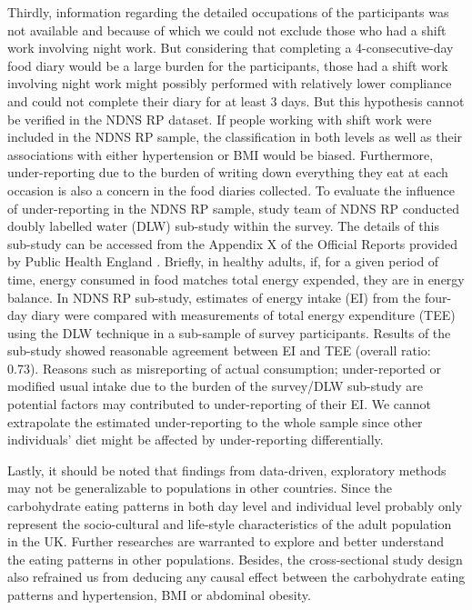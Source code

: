 Thirdly, information regarding the detailed occupations of the participants was not available and because of which we could not exclude those who had a shift work involving night work. But considering that completing a 4-consecutive-day food diary would be a large burden for the participants, those had a shift work involving night work might possibly performed with relatively lower compliance and could not complete their diary for at least 3 days. But this hypothesis cannot be verified in the NDNS RP dataset. If people working with shift work were included in the NDNS RP sample, the classification in both levels as well as their associations with either hypertension or BMI would be biased. Furthermore, under-reporting due to the burden of writing down everything they eat at each occasion is also a concern in the food diaries collected. To evaluate the influence of under-reporting in the NDNS RP sample, study team of NDNS RP conducted doubly labelled water (DLW) sub-study within the survey. The details of this sub-study can be accessed from the Appendix X of the Official Reports provided by Public Health England \parencite{bates2014national,roberts2018national,NDNSofficial}. Briefly, in healthy adults, if, for a given period of time, energy consumed in food matches total energy expended, they are in energy balance. In NDNS RP sub-study, estimates of energy intake (EI) from the four-day diary were compared with measurements of total energy expenditure (TEE) using the DLW technique in a sub-sample of survey participants. Results of the sub-study showed reasonable agreement between EI and TEE (overall ratio: 0.73). Reasons such as misreporting of actual consumption; under-reported or modified usual intake due to the burden of the survey/DLW sub-study are potential factors may contributed to under-reporting of their EI. We cannot extrapolate the estimated under-reporting to the whole sample since other individuals' diet might be affected by under-reporting differentially. 

Lastly, it should be noted that findings from data-driven, exploratory methods may not be
generalizable to populations in other countries. Since the carbohydrate eating patterns in both day level and individual level probably only represent the socio-cultural and life-style characteristics of the adult population in the UK. Further researches are warranted to explore and better understand the eating patterns in other populations. Besides, the cross-sectional study design also refrained us from deducing any causal effect between the carbohydrate eating patterns and hypertension, BMI or abdominal obesity. 

